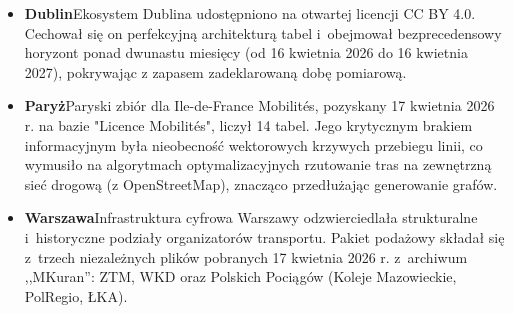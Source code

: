 \documentclass{pracamgr}
\begin{document}
\begin{itemize}
\item[]\textbf{Dublin}\newline Ekosystem Dublina udostępniono na otwartej licencji CC BY \mbox{4.0}. Cechował się on perfekcyjną architekturą tabel i~obejmował bezprecedensowy horyzont ponad dwunastu miesięcy (od 16 kwietnia 2026 do 16 kwietnia 2027), pokrywając z zapasem zadeklarowaną dobę pomiarową.
\item[]\textbf{Paryż}\newline Paryski zbiór dla \mbox{Ile-de-France} Mobilités, pozyskany 17 kwietnia 2026 r. na bazie "Licence Mobilités", liczył 14 tabel. Jego krytycznym brakiem informacyjnym była nieobecność wektorowych krzywych przebiegu linii, co wymusiło na algorytmach optymalizacyjnych rzutowanie tras na zewnętrzną sieć drogową (z OpenStreetMap), znacząco przedłużając generowanie grafów.
\item[]\textbf{Warszawa}\newline Infrastruktura cyfrowa Warszawy odzwierciedlała strukturalne i~historyczne podziały organizatorów transportu. Pakiet podażowy składał się z~trzech niezależnych plików pobranych 17 kwietnia 2026 r. z~archiwum ,,MKuran'': ZTM, WKD oraz Polskich Pociągów (Koleje Mazowieckie, PolRegio, ŁKA). 
\end{itemize}
\end{document}
